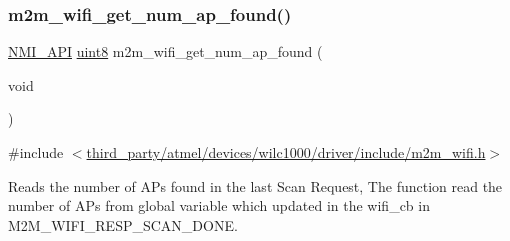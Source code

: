 \subsubsection{\texorpdfstring{m2m\+\_\+wifi\+\_\+get\+\_\+num\+\_\+ap\+\_\+found()}{m2m\_wifi\_get\_num\_ap\_found()}}
{\footnotesize\ttfamily \hyperlink{group__BSPDefine_gaecc0323d771e41ef81a76b5f12783e22}{N\+M\+I\+\_\+\+A\+PI} \hyperlink{group__DataT_ga4df709a77647e870bbf1d955b8edc9a6}{uint8} m2m\+\_\+wifi\+\_\+get\+\_\+num\+\_\+ap\+\_\+found (\begin{DoxyParamCaption}\item[{void}]{ }\end{DoxyParamCaption})}



{\ttfamily \#include $<$\hyperlink{m2m__wifi_8h}{third\+\_\+party/atmel/devices/wilc1000/driver/include/m2m\+\_\+wifi.\+h}$>$}



Reads the number of AP\textquotesingle{}s found in the last Scan Request, The function read the number of AP\textquotesingle{}s from global variable which updated in the wifi\+\_\+cb in M2\+M\+\_\+\+W\+I\+F\+I\+\_\+\+R\+E\+S\+P\+\_\+\+S\+C\+A\+N\+\_\+\+D\+O\+NE. 

